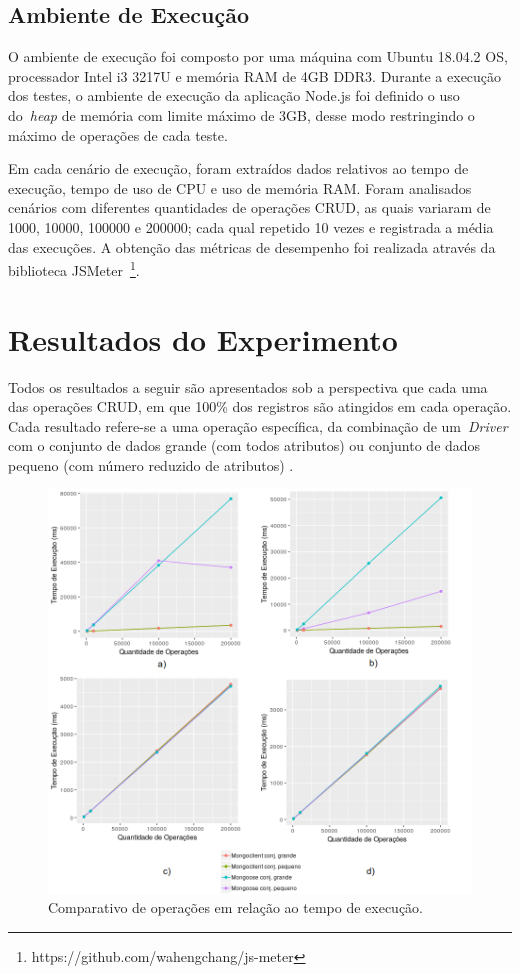 \documentclass[12pt]{article}
\begin{document}
\subsection{Ambiente de Execução}

O ambiente de execução foi composto por uma máquina com Ubuntu 18.04.2 OS, processador Intel i3 3217U e memória RAM de 4GB DDR3. 
Durante a execução dos testes, o ambiente de execução da aplicação Node.js foi definido o uso do~\emph{heap} de memória com limite máximo de 3GB, desse modo restringindo o máximo de operações de cada teste.

Em cada cenário de execução, foram extraídos dados relativos ao tempo de execução, tempo de uso de CPU e uso de memória RAM. 
Foram analisados cenários com diferentes quantidades de operações CRUD, as quais variaram de 1000, 10000, 100000 e 200000; cada qual repetido 10 vezes e registrada a média das execuções. A obtenção das métricas de desempenho foi realizada através da biblioteca JSMeter~\footnote{https://github.com/wahengchang/js-meter}. 

\section{Resultados do Experimento}
\label{section:resultados}

Todos os resultados a seguir são apresentados sob a perspectiva que cada uma das operações CRUD, em que 100\% dos registros são atingidos em cada operação. 
Cada resultado refere-se a uma operação específica, da combinação de um~\emph{Driver} com o  conjunto de dados grande (com todos atributos) ou conjunto de dados pequeno (com número reduzido de atributos) .

\begin{figure}[!ht]
\centering
\includegraphics[width=\textwidth]{images/time}
\caption{Comparativo de operações em relação ao tempo de execução.}
\label{fig:time}
\end{figure}
\end{document}
